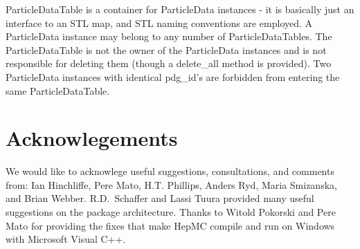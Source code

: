 \documentclass[11pt,letterpaper]{article}
\begin{document}
ParticleDataTable is a container for ParticleData instances - it is
basically just an interface to an STL map, and STL naming conventions
are employed. A ParticleData instance may belong to any number of
ParticleDataTables. The ParticleDataTable is not the owner of the
ParticleData instances and is not responsible for deleting them
(though a delete\_all method is provided). Two ParticleData instances
with identical pdg\_id's are forbidden from entering the same
ParticleDataTable. 

%
%

\section{Acknowlegements}

We would like to acknowlege useful suggestions, consultations, and
comments from: Ian Hinchliffe, Pere Mato, H.T. Phillips, Anders Ryd,
Maria Smizanska, and Brian Webber.  R.D.\ Schaffer and Lassi
Tuura provided many useful suggestions on the package architecture.
Thanks to Witold Pokorski and Pere Mato for providing the fixes that
make HepMC compile and run on Windows with Microsoft Visual C++.


%
%
\end{document}
